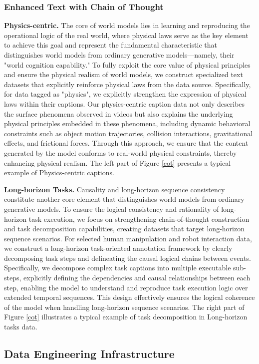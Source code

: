 \subsubsection{Enhanced Text with Chain of Thought}

\textbf{Physics-centric.}
The core of world models lies in learning and reproducing the operational logic of the real world, where physical laws serve as the key element to achieve this goal and represent the fundamental characteristic that distinguishes world models from ordinary generative models—namely, their "world cognition capability." To fully exploit the core value of physical principles and ensure the physical realism of world models, we construct specialized text datasets that explicitly reinforce physical laws from the data source.
Specifically, for data tagged as "physics", we explicitly strengthen the expression of physical laws within their captions. Our physics-centric caption data not only describes the surface phenomena observed in videos but also explains the underlying physical principles embedded in these phenomena, including dynamic behavioral constraints such as object motion trajectories, collision interactions, gravitational effects, and frictional forces. Through this approach, we ensure that the content generated by the model conforms to real-world physical constraints, thereby enhancing physical realism.
The left part of Figure \ref{cot} presents a typical example of Physics-centric captions.

\textbf{Long-horizon Tasks.}
Causality and long-horizon sequence consistency constitute another core element that distinguishes world models from ordinary generative models. To ensure the logical consistency and rationality of long-horizon task execution, we focus on strengthening chain-of-thought construction and task decomposition capabilities, creating datasets that target long-horizon sequence scenarios.
For selected human manipulation and robot interaction data, we construct a long-horizon task-oriented annotation framework by clearly decomposing task steps and delineating the causal logical chains between events. Specifically, we decompose complex task captions into multiple executable sub-steps, explicitly defining the dependencies and causal relationships between each step, enabling the model to understand and reproduce task execution logic over extended temporal sequences. This design effectively ensures the logical coherence of the model when handling long-horizon sequence scenarios.
The right part of Figure \ref{cot} illustrates a typical example of task decomposition in Long-horizon tasks data.







\subsection{Data Engineering Infrastructure} 



